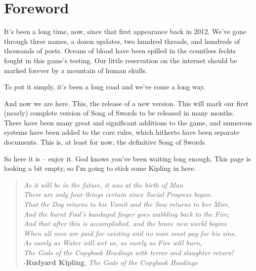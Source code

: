 \documentclass[oneside,11pt,english]{book}
\begin{document}
\section*{Foreword}
It’s been a long time, now, since that first appearance back in 2012. We’ve gone
through three names, a dozen updates, two hundred threads, and hundreds of
thousands of posts. Oceans of blood have been spilled in the countless fechts
fought in this game’s testing. Our little reservation on the internet should be
marked forever by a mountain of human skulls. 

To put it simply, it’s been a long road and we’ve come a long way.

\noindent And now we are here. This, the release of a new version. This will
mark our first (nearly) complete version of Song of Swords to be released in
many months. There have been many great and significant additions to the game,
and numerous systems have been added to the core rules, which hitherto have been
separate documents. This is, at least for now, the definitive Song of Swords.  

So here it is -- enjoy it. God knows you’ve been waiting long enough. This page
is looking a bit empty, so I’m going to stick some Kipling in here.  
\vspace{0.8 cm}
{\large
  \begin{verse}
    \emph{As it will be in the future, it was at the birth of Man\\
      There are only four things certain since Social Progress began. \\
      That the Dog returns to his Vomit and the Sow returns to her Mire,\\
      And the burnt Fool's bandaged finger goes wabbling back to the Fire; \\}
    \vspace{0.4 cm}
    \emph{And that after this is accomplished, and the brave new world begins \\ 
      When all men are paid for existing and no man must pay for his sins, \\
      As surely as Water will wet us, as surely as Fire will burn, \\ 
      The Gods of the Copybook Headings with terror and slaughter return! \\}
    \vspace{0.3 cm}
    \hfill-\textbf{Rudyard Kipling}, \textit{The Gods of the Copybook Headings} 
  \end{verse}}
\newpage
\end{document}
